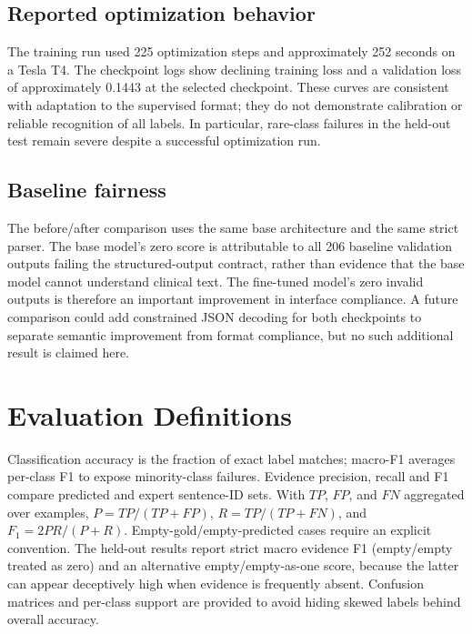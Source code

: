 \documentclass[conference]{IEEEtran}
\begin{document}
\subsection{Reported optimization behavior}
The training run used 225 optimization steps and approximately 252 seconds on a Tesla T4. The checkpoint logs show declining training loss and a validation loss of approximately 0.1443 at the selected checkpoint. These curves are consistent with adaptation to the supervised format; they do not demonstrate calibration or reliable recognition of all labels. In particular, rare-class failures in the held-out test remain severe despite a successful optimization run.

\subsection{Baseline fairness}
The before/after comparison uses the same base architecture and the same strict parser. The base model's zero score is attributable to all 206 baseline validation outputs failing the structured-output contract, rather than evidence that the base model cannot understand clinical text. The fine-tuned model's zero invalid outputs is therefore an important improvement in interface compliance. A future comparison could add constrained JSON decoding for both checkpoints to separate semantic improvement from format compliance, but no such additional result is claimed here.

\section{Evaluation Definitions}
Classification accuracy is the fraction of exact label matches; macro-F1 averages per-class F1 to expose minority-class failures. Evidence precision, recall and F1 compare predicted and expert sentence-ID sets. With $TP$, $FP$, and $FN$ aggregated over examples, $P=TP/(TP+FP)$, $R=TP/(TP+FN)$, and $F_1=2PR/(P+R)$. Empty-gold/empty-predicted cases require an explicit convention. The held-out results report strict macro evidence F1 (empty/empty treated as zero) and an alternative empty/empty-as-one score, because the latter can appear deceptively high when evidence is frequently absent. Confusion matrices and per-class support are provided to avoid hiding skewed labels behind overall accuracy.
\end{document}
